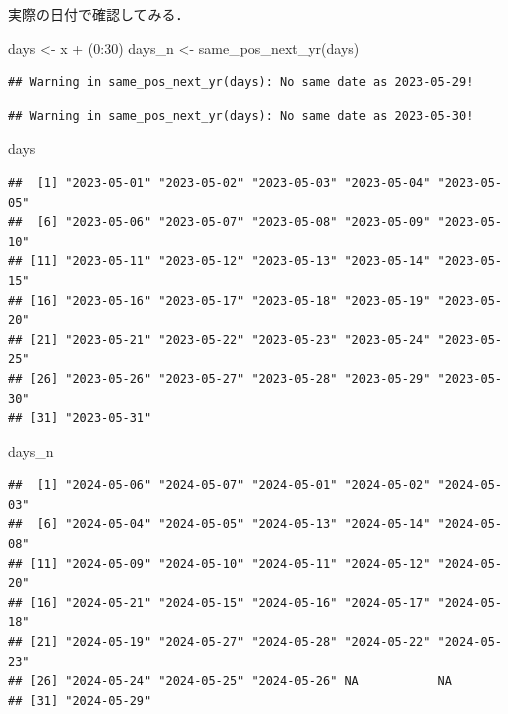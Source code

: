 \documentclass[
]{article}
\newenvironment{Shaded}{\begin{snugshade}}{\end{snugshade}}
\newcommand{\DecValTok}[1]{\textcolor[rgb]{0.00,0.00,0.81}{#1}}
\newcommand{\FunctionTok}[1]{\textcolor[rgb]{0.00,0.00,0.00}{#1}}
\newcommand{\NormalTok}[1]{#1}
\newcommand{\OtherTok}[1]{\textcolor[rgb]{0.56,0.35,0.01}{#1}}
\newcommand{\SpecialCharTok}[1]{\textcolor[rgb]{0.00,0.00,0.00}{#1}}
\begin{document}
実際の日付で確認してみる．

\begin{Shaded}
\begin{Highlighting}[]
\NormalTok{days   }\OtherTok{\textless{}{-}}\NormalTok{ x }\SpecialCharTok{+}\NormalTok{ (}\DecValTok{0}\SpecialCharTok{:}\DecValTok{30}\NormalTok{)}
\NormalTok{days\_n }\OtherTok{\textless{}{-}} \FunctionTok{same\_pos\_next\_yr}\NormalTok{(days)}
\end{Highlighting}
\end{Shaded}

\begin{verbatim}
## Warning in same_pos_next_yr(days): No same date as 2023-05-29!
\end{verbatim}

\begin{verbatim}
## Warning in same_pos_next_yr(days): No same date as 2023-05-30!
\end{verbatim}

\begin{Shaded}
\begin{Highlighting}[]
\NormalTok{days}
\end{Highlighting}
\end{Shaded}

\begin{verbatim}
##  [1] "2023-05-01" "2023-05-02" "2023-05-03" "2023-05-04" "2023-05-05"
##  [6] "2023-05-06" "2023-05-07" "2023-05-08" "2023-05-09" "2023-05-10"
## [11] "2023-05-11" "2023-05-12" "2023-05-13" "2023-05-14" "2023-05-15"
## [16] "2023-05-16" "2023-05-17" "2023-05-18" "2023-05-19" "2023-05-20"
## [21] "2023-05-21" "2023-05-22" "2023-05-23" "2023-05-24" "2023-05-25"
## [26] "2023-05-26" "2023-05-27" "2023-05-28" "2023-05-29" "2023-05-30"
## [31] "2023-05-31"
\end{verbatim}

\begin{Shaded}
\begin{Highlighting}[]
\NormalTok{days\_n}
\end{Highlighting}
\end{Shaded}

\begin{verbatim}
##  [1] "2024-05-06" "2024-05-07" "2024-05-01" "2024-05-02" "2024-05-03"
##  [6] "2024-05-04" "2024-05-05" "2024-05-13" "2024-05-14" "2024-05-08"
## [11] "2024-05-09" "2024-05-10" "2024-05-11" "2024-05-12" "2024-05-20"
## [16] "2024-05-21" "2024-05-15" "2024-05-16" "2024-05-17" "2024-05-18"
## [21] "2024-05-19" "2024-05-27" "2024-05-28" "2024-05-22" "2024-05-23"
## [26] "2024-05-24" "2024-05-25" "2024-05-26" NA           NA          
## [31] "2024-05-29"
\end{verbatim}
\end{document}
